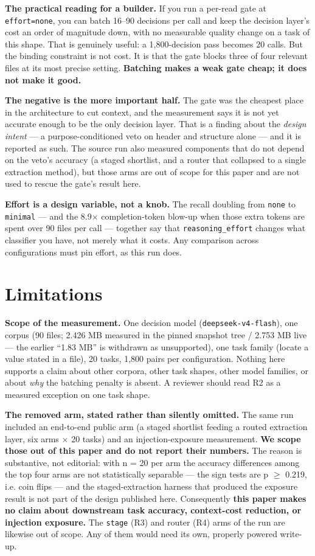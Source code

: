 \documentclass[10pt]{article}
\begin{document}
\textbf{The practical reading for a builder.} If you run a per-read gate at \texttt{effort=none}, you can batch 16--90 decisions per call and keep the decision layer's cost an order of magnitude down, with no measurable quality change on a task of this shape. That is genuinely useful: a 1,800-decision pass becomes 20 calls. But the binding constraint is not cost. It is that the gate blocks three of four relevant files at its most precise setting. \textbf{Batching makes a weak gate cheap; it does not make it good.}

\textbf{The negative is the more important half.} The gate was the cheapest place in the architecture to cut context, and the measurement says it is not yet accurate enough to be the only decision layer. That is a finding about the \emph{design intent} --- a purpose-conditioned veto on header and structure alone --- and it is reported as such. The source run also measured components that do not depend on the veto's accuracy (a staged shortlist, and a router that collapsed to a single extraction method), but those arms are out of scope for this paper and are not used to rescue the gate's result here.

\textbf{Effort is a design variable, not a knob.} The recall doubling from \texttt{none} to \texttt{minimal} --- and the 8.9$\times$ completion-token blow-up when those extra tokens are spent over 90 files per call --- together say that \texttt{reasoning\_effort} changes what classifier you have, not merely what it costs. Any comparison across configurations must pin effort, as this run does.

\section{Limitations}

\textbf{Scope of the measurement.} One decision model (\texttt{deepseek-v4-flash}), one corpus (90 files; 2.426 MB measured in the pinned snapshot tree / 2.753 MB live --- the earlier ``1.83 MB'' is withdrawn as unsupported), one task family (locate a value stated in a file), 20 tasks, 1,800 pairs per configuration. Nothing here supports a claim about other corpora, other task shapes, other model families, or about \emph{why} the batching penalty is absent. A reviewer should read R2 as a measured exception on one task shape.

\textbf{The removed arm, stated rather than silently omitted.} The same run included an end-to-end public arm (a staged shortlist feeding a routed extraction layer, six arms $\times$ 20 tasks) and an injection-exposure measurement. \textbf{We scope those out of this paper and do not report their numbers.} The reason is substantive, not editorial: with n = 20 per arm the accuracy differences among the top four arms are not statistically separable --- the sign tests are p $\ge$ 0.219, i.e. coin flips --- and the staged-extraction harness that produced the exposure result is not part of the design published here. Consequently \textbf{this paper makes no claim about downstream task accuracy, context-cost reduction, or injection exposure.} The \texttt{stage} (R3) and router (R4) arms of the run are likewise out of scope. Any of them would need its own, properly powered write-up.
\end{document}
